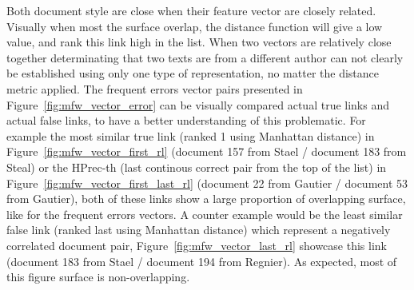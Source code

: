 Both document style are close when their feature vector are closely related.
Visually when most the surface overlap, the distance function will give a low value, and rank this link high in the list.
When two vectors are relatively close together determinating that two texts are from a different author can not clearly be established using only one type of representation, no matter the distance metric applied.
The frequent errors vector pairs presented in Figure~\ref{fig:mfw_vector_error} can be visually compared actual true links and actual false links, to have a better understanding of this problematic.
For example the most similar true link (ranked 1 using Manhattan distance) in Figure~\ref{fig:mfw_vector_first_rl} (document 157 from Stael / document 183 from Steal) or the HPrec-th (last continous correct pair from the top of the list) in Figure~\ref{fig:mfw_vector_first_last_rl} (document 22 from Gautier / document 53 from Gautier), both of these links show a large proportion of overlapping surface, like for the frequent errors vectors.
A counter example would be the least similar false link (ranked last using Manhattan distance) which represent a negatively correlated document pair, Figure~\ref{fig:mfw_vector_last_rl} showcase this link (document 183 from Stael / document 194 from Regnier).
As expected, most of this figure surface is non-overlapping.

